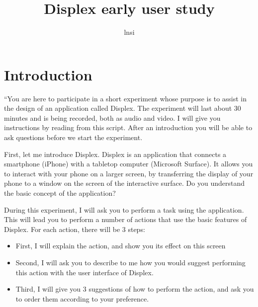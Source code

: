 \documentclass[11pt]{amsart}
\title{Displex early user study}
\author{lnsi}
\begin{document}
\maketitle

\section{Introduction}
``You are here to participate in a short experiment whose purpose is to assist in the design of an application called Displex.
The experiment will last about 30 minutes and is being recorded, both as audio and video.
I will give you instructions by reading from this script.
After an introduction you will be able to ask questions before we start the experiment.

First, let me introduce Displex.
Displex is an application that connects a smartphone (iPhone) with a tabletop computer (Microsoft Surface).
It allows you to interact with your phone on a larger screen, by transferring the display of your phone to a window on the screen of the interactive surface.
Do you understand the basic concept of the application?

During this experiment, I will ask you to perform a task using the application.
This will lead you to perform a number of actions that use the basic features of Displex.
For each action, there will be 3 steps:

\begin{itemize}
\item{First, I will explain the action, and show you its effect on this screen}
\item{Second, I will ask you to describe to me how you would suggest performing this action with the user interface of Displex.}
\item{Third, I will give you 3 suggestions of how to perform the action, and ask you to order them according to your preference.}
\end{itemize}
\end{document}
